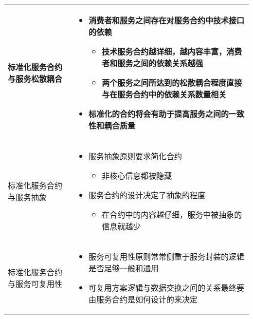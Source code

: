 \begin{longtable}{|m{3cm}<{\centering}|m{12cm}|}
    \hline
    标准化服务合约与服务松散耦合
    & 
    \vspace{-1.3em}
    \begin{itemize}[leftmargin=1.5em,itemsep=-3pt,topsep=-3pt]
        \item 消费者和服务之间存在对服务合约中技术接口的依赖
        \begin{itemize}[leftmargin=1.5em,itemsep=-3pt,topsep=-3pt]
            \item 技术服务合约越详细，越内容丰富，消费者和服务之间的依赖关系越强
            \item 两个服务之间所达到的松散耦合程度直接与在服务合约中的依赖关系数量相关
        \end{itemize}
        \item 标准化的合约将会有助于提高服务之间的一致性和耦合质量
    \vspace{-1.5em}
    \end{itemize}  
    \\ \hline
    标准化服务合约与服务抽象 
    & 
    \vspace{-1.3em}
    \begin{itemize}[leftmargin=1.5em,itemsep=-3pt,topsep=-3pt]
        \item 服务抽象原则要求简化合约
        \begin{itemize}[leftmargin=1.5em,itemsep=-3pt,topsep=-3pt]
            \item 非核心信息都被隐藏
        \end{itemize}
        \item 服务合约的设计决定了抽象的程度
        \begin{itemize}[leftmargin=1.5em,itemsep=-3pt,topsep=-3pt]
            \item 在合约中的内容越仔细，服务中被抽象的信息就越少
        \end{itemize}
    \vspace{-1.2em}
    \end{itemize}  
    \\ \hline
    标准化服务合约与服务可复用性 
    & 
    \vspace{-1.3em}
    \begin{itemize}[leftmargin=1.5em,itemsep=-3pt,topsep=-3pt]
        \item 服务可复用性原则常常侧重于服务封装的逻辑是否足够一般和通用
        \item 可复用方案逻辑与数据交换之间的关系最终要由服务合约是如何设计的来决定

\end{itemize}
\end{longtable}
